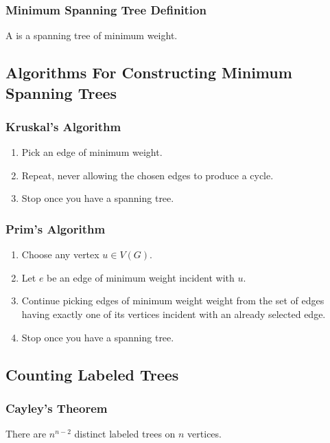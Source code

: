 \subsubsection*{Minimum Spanning Tree Definition}
A  is a spanning tree of minimum weight.

\subsection*{Algorithms For Constructing Minimum Spanning Trees}

\subsubsection*{Kruskal's Algorithm}
\begin{enumerate}
    \item Pick an edge of minimum weight.
    \item Repeat, never allowing the chosen edges to produce a cycle.
    \item Stop once you have a spanning tree.
\end{enumerate}

\subsubsection*{Prim's Algorithm}
\begin{enumerate}
    \item Choose any vertex $u \in V(G)$.
    \item Let $e$ be an edge of minimum weight incident with $u$.
    \item Continue picking edges of minimum weight weight from the set of edges having exactly one of its vertices incident with an already selected edge.
    \item Stop once you have a spanning tree.
\end{enumerate}

\subsection{Counting Labeled Trees}

\subsubsection*{Cayley's Theorem}
There are $n^{n-2}$ distinct labeled trees on $n$ vertices.